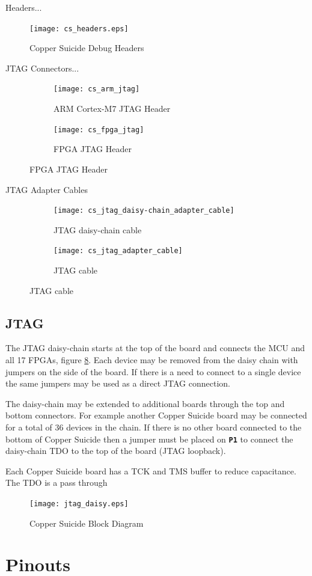\documentclass{article}
\newcommand{\designator}[1]{\textbf{\texttt{#1}}}
\begin{document}
Headers...

\begin{figure}[H]
  \centering
  \texttt{[image: cs\_headers.eps]}
  \caption{Copper Suicide Debug Headers}
  \label{fig:debugheaders}
\end{figure}

JTAG Connectors...

\begin{figure}[H]
  \centering
  \begin{subfigure}{0.5\textwidth}
    \centering
    \texttt{[image: cs\_arm\_jtag]}
    \caption{ARM Cortex-M7 JTAG Header}
    \label{fig:armjtag}
  \end{subfigure}%
  \begin{subfigure}{0.5\textwidth}
    \centering
    \texttt{[image: cs\_fpga\_jtag]}
    \caption{FPGA JTAG Header}
    \label{fig:fpgajtag}
  \end{subfigure}
\end{figure}

JTAG Adapter Cables

\begin{figure}[H]
  \centering
  \begin{subfigure}{0.5\textwidth}
    \centering
    \texttt{[image: cs\_jtag\_daisy-chain\_adapter\_cable]}
    \caption{JTAG daisy-chain cable}
    \label{fig:jtagdaisychaincable}
  \end{subfigure}%
  \begin{subfigure}{0.5\textwidth}
    \centering
    \texttt{[image: cs\_jtag\_adapter\_cable]}
    \caption{JTAG cable}
    \label{fig:jtagcable}
  \end{subfigure}
\end{figure}


\newpage

\subsection{JTAG}

The JTAG daisy-chain starts at the top of the board and connects the MCU and all 17 FPGAs, figure \ref{fig:jtagdaisy}. Each device may be removed from the daisy chain with jumpers on the side of the board. If there is a need to connect to a single device the same jumpers may be used as a direct JTAG connection.

The daisy-chain may be extended to additional boards through the top and bottom connectors. For example another Copper Suicide board may be connected for a total of 36 devices in the chain. If there is no other board connected to the bottom of Copper Suicide then a jumper must be placed on \designator{P1} to connect the daisy-chain TDO to the top of the board (JTAG loopback).

Each Copper Suicide board has a TCK and TMS buffer to reduce capacitance. The TDO is a pass through 

\begin{figure}[H]
  \centering
  \texttt{[image: jtag\_daisy.eps]}
  \caption{Copper Suicide Block Diagram}
  \label{fig:jtagdaisy}
\end{figure}

\section{Pinouts}
\end{document}
